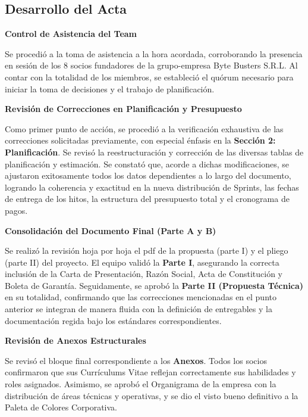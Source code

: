\newpage
\subsection{Desarrollo del Acta}

\noindent \textbf{Control de Asistencia del Team}\par
Se procedió a la toma de asistencia a la hora acordada, corroborando la presencia en sesión de los 8 socios fundadores de la grupo-empresa Byte Busters S.R.L. Al contar con la totalidad de los miembros, se estableció el quórum necesario para iniciar la toma de decisiones y el trabajo de planificación.

\vspace*{0.5cm}
\noindent\textbf{Revisión de Correcciones en Planificación y Presupuesto}\par
Como primer punto de acción, se procedió a la verificación exhaustiva de las correcciones solicitadas previamente, con especial énfasis en la \textbf{Sección 2: Planificación}. Se revisó la reestructuración y corrección de las diversas tablas de planificación y estimación. Se constató que, acorde a dichas modificaciones, se ajustaron exitosamente todos los datos dependientes a lo largo del documento, logrando la coherencia y exactitud en la nueva distribución de Sprints, las fechas de entrega de los hitos, la estructura del presupuesto total y el cronograma de pagos.

\vspace*{0.5cm}
\noindent \textbf{Consolidación del Documento Final (Parte A y B)}\par
Se realizó la revisión hoja por hoja el pdf de la propuesta (parte I) y el pliego (parte II) del proyecto. El equipo validó la \textbf{Parte I}, asegurando la correcta inclusión de la Carta de Presentación, Razón Social, Acta de Constitución y Boleta de Garantía. Seguidamente, se aprobó la \textbf{Parte II (Propuesta Técnica)} en su totalidad, confirmando que las correcciones mencionadas en el punto anterior se integran de manera fluida con la definición de entregables y la documentación regida bajo los estándares correspondientes.

\vspace*{0.5cm}
\noindent \textbf{Revisión de Anexos Estructurales}\par
Se revisó el bloque final correspondiente a los \textbf{Anexos}. Todos los socios confirmaron que sus Currículums Vitae reflejan correctamente sus habilidades y roles asignados. Asimismo, se aprobó el Organigrama de la empresa con la distribución de áreas técnicas y operativas, y se dio el visto bueno definitivo a la Paleta de Colores Corporativa.

